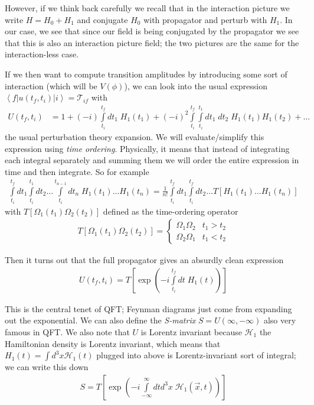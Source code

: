 \documentclass[10pt]{report}
\newcommand{\bra}[1]{\left<#1\right|}
\newcommand{\ket}[1]{\left|#1\right>}
\begin{document}
However, if we think back carefully we recall that in the interaction picture we write $H = H_0 + H_1$ and conjugate $H_0$ with propagator and perturb with $H_1$. In our case, we see that since our field is being conjugated by the propagator we see that this is also an interaction picture field; the two pictures are the same for the interaction-less case.

If we then want to compute transition amplitudes by introducing some sort of interaction (which will be $V(\phi)$), we can look into the usual expression $\bra{f}u(t_f, t_i)\ket{i} = \mathcal{T}_{if}$ with
\begin{align}
    U(t_f,t_i) &= 1 + (-i)\int\limits_{t_i}^{t_f}dt_1\;H_1(t_1) + (-i)^2 \int\limits_{t_i}^{t_f}\int\limits_{t_{i}}^{t_1}dt_1\;dt_2\;H_1(t_1)H_1(t_2) +\dots
\end{align}
the usual perturbation theory expansion. We will evaluate/simplify this expression using \emph{time ordering}. Physically, it means that instead of integrating each integral separately and summing them we will order the entire expression in time and then integrate. So for example
\begin{align}
    \int\limits_{t_i}^{t_f}dt_1\int\limits_{t_i}^{t_1}dt_2\dots \int\limits_{t_i}^{t_{n-1}}dt_n\;H_1(t_1)\dots H_1(t_n) = \frac{1}{n!}\int\limits_{t_i}^{t_f}dt_1\int\limits_{t_i}^{t_f}dt_2\dots T\left[ H_1(t_1)\dots H_1(t_n) \right]
\end{align}
with $T[\Omega_1(t_1)\Omega_2(t_2)]$ defined as the time-ordering operator
\begin{align}
    T\left[ \Omega_1(t_1)\Omega_2(t_2) \right] =
    \begin{cases}
        \Omega_1\Omega_2 & t_1 > t_2\\
        \Omega_2 \Omega_1 & t_1 < t_2
    \end{cases}
\end{align}

Then it turns out that the full propagator gives an absurdly clean expression
\begin{align}
    U(t_f, t_i) = T\left[ \exp\left( -i \int\limits_{t_i}^{t_f}dt\;H_1(t) \right) \right]
\end{align}

This is the central tenet of QFT; Feynman diagrams just come from expanding out the exponential. We can also define the \emph{S-matrix} $S = U(\infty, -\infty)$ also very famous in QFT. We also note that $U$ is Lorentz invariant because $\mathcal{H}_1$ the Hamiltonian density is Lorentz invariant, which means that $H_1(t) = \int d^3x \mathcal{H}_1(t)$ plugged into above is Lorentz-invariant sort of integral; we can write this down
\begin{align}
    S = T\left[ \exp\left( -i \int\limits_{-\infty}^{\infty}dt d^3x\;\mathcal{H}_1(\vec{x},t) \right) \right]
\end{align}
\end{document}

